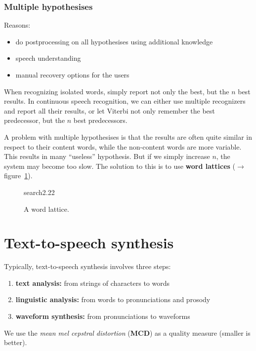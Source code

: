 \documentclass[11pt]{article}
\begin{document}
\subsubsection{Multiple hypothesises}
Reasons:
\begin{itemize}
    \item do postprocessing on all hypothesises using additional knowledge
    \item speech understanding
    \item manual recovery options for the users
\end{itemize}
When recognizing isolated words, simply report not only the best, but the $n$ best results. In continuous speech recognition, we can either use multiple recognizers and report all their results, or let Viterbi not only remember the best predecessor, but the $n$ best predecessors.

A problem with multiple hypothesises is that the results are often quite similar in respect to their content words, while the non-content words are more variable. This results in many ``useless'' hypothesis. But if we simply increase $n$, the system may become too slow. The solution to this is to use \textbf{word lattices} ($\to$ figure~\ref{fig:wordLattice}).
\begin{figure}[htb]
    \begin{minipage}{\linewidth}
        \vspace{3cm}
        \hfill \scriptsize search2.22
    \end{minipage}
    \caption{\label{fig:wordLattice} A word lattice.}
\end{figure}

\newpage

\section{Text-to-speech synthesis}

Typically, text-to-speech synthesis involves three steps:
\begin{enumerate}
    \item \textbf{text analysis:} from strings of characters to words
    \item \textbf{linguistic analysis:} from words to pronunciations and prosody
    \item \textbf{waveform synthesis:} from pronunciations to waveforms
\end{enumerate}

We use the \textit{mean mel cepstral distortion} (\textbf{MCD}) as a quality measure (smaller is better).
\end{document}
